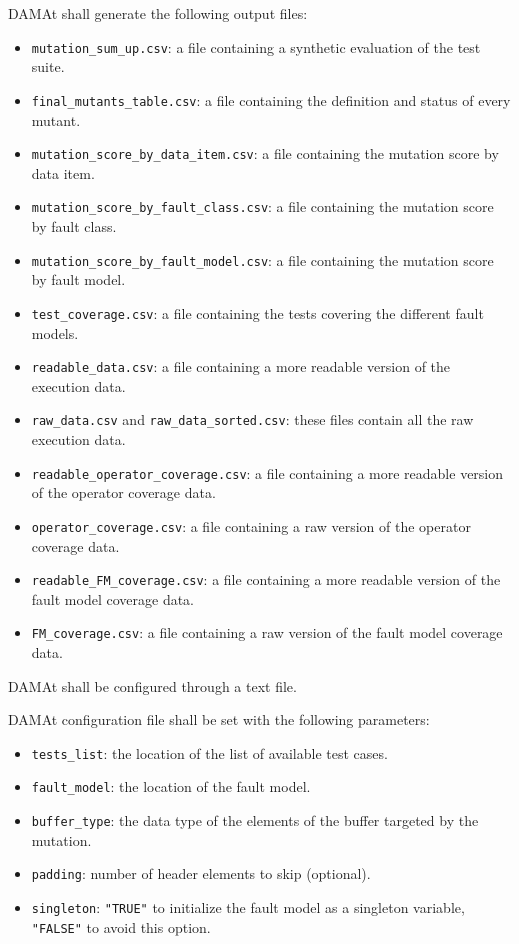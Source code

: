 \RQ{} DAMAt shall generate the following output files:
	\begin{itemize}
		\item \texttt{mutation\_sum\_up.csv}: a file containing a synthetic evaluation of the test suite.
		\item \texttt{final\_mutants\_table.csv}: a file containing the definition and status of every mutant.
		\item \texttt{mutation\_score\_by\_data\_item.csv}: a file containing the mutation score by data item.
		\item \texttt{mutation\_score\_by\_fault\_class.csv}: a file containing the mutation score by fault class.
		\item \texttt{mutation\_score\_by\_fault\_model.csv}: a file containing the mutation score by fault model.
		\item \texttt{test\_coverage.csv}: a file containing the tests covering the different fault models.
		\item \texttt{readable\_data.csv}: a file containing a more readable version of the execution data.
		\item \texttt{raw\_data.csv} and \texttt{raw\_data\_sorted.csv}: these files contain all the raw execution data.
		\item \texttt{readable\_operator\_coverage.csv}: a file containing a more readable version of the operator coverage data.
		\item \texttt{operator\_coverage.csv}: a file containing a raw version of the operator coverage data.
		\item \texttt{readable\_FM\_coverage.csv}: a file containing a more readable version of the fault model coverage data.
		\item \texttt{FM\_coverage.csv}: a file containing a raw version of the fault model coverage data.
	\end{itemize}
	
\RQ{} DAMAt shall be configured through a text file.

\RQ{} DAMAt configuration file shall be set with the following parameters:
	\begin{itemize}
		\item \texttt{tests\_list}: the location of the list of available test cases.
		\item \texttt{fault\_model}: the location of the fault model.
		\item \texttt{buffer\_type}: the data type of the elements of the buffer targeted by the mutation.
		\item \texttt{padding}: number of header elements to skip (optional).
		\item \texttt{singleton}: \texttt{"TRUE"} to initialize the fault model as a singleton variable, \texttt{"FALSE"} to avoid this option.
	\end{itemize}


